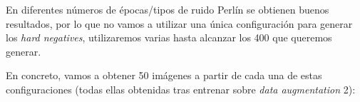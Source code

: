 \begin{figure}[H]
\centering
\end{figure}

En diferentes números de épocas/tipos de ruido Perlín se obtienen buenos resultados, por lo que no vamos a utilizar una única configuración para generar los \textit{hard negatives}, utilizaremos varias hasta alcanzar los 400 que queremos generar. 

En concreto, vamos a obtener 50 imágenes a partir de cada una de estas configuraciones (todas ellas obtenidas tras entrenar sobre \textit{data augmentation} 2):


